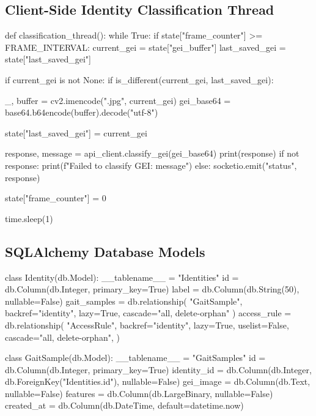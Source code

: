 \begin{appendices}
    \subsection{Client-Side Identity Classification Thread}
    \label{app:identity-classification-thread-implementation}

    \begin{code}
def classification_thread():
    while True:
        if state["frame_counter"] >= FRAME_INTERVAL:
            current_gei = state["gei_buffer"]
            last_saved_gei = state["last_saved_gei"]

            if current_gei is not None:
                if is_different(current_gei, last_saved_gei):

                    _, buffer = cv2.imencode(".jpg", current_gei)
                    gei_base64 = base64.b64encode(buffer).decode("utf-8")

                    state["last_saved_gei"] = current_gei

                    response, message = api_client.classify_gei(gei_base64)
                    print(response)
                    if not response:
                        print(f"Failed to classify GEI: {message}")
                    else:
                        socketio.emit("status", response)

            state["frame_counter"] = 0

        time.sleep(1)
    \end{code}

    \subsection{SQLAlchemy Database Models}
    \label{app:database-models-implementation}

    \begin{code}
class Identity(db.Model):
    __tablename__ = "Identities"
    id = db.Column(db.Integer, primary_key=True)
    label = db.Column(db.String(50), nullable=False)
    gait_samples = db.relationship(
        "GaitSample", backref="identity", lazy=True, cascade="all, delete-orphan"
    )
    access_rule = db.relationship(
        "AccessRule",
        backref="identity",
        lazy=True,
        uselist=False,
        cascade="all, delete-orphan",
    )


class GaitSample(db.Model):
    __tablename__ = "GaitSamples"
    id = db.Column(db.Integer, primary_key=True)
    identity_id = db.Column(db.Integer, db.ForeignKey("Identities.id"), nullable=False)
    gei_image = db.Column(db.Text, nullable=False)
    features = db.Column(db.LargeBinary, nullable=False)
    created_at = db.Column(db.DateTime, default=datetime.now)



\end{code}
\end{appendices}
